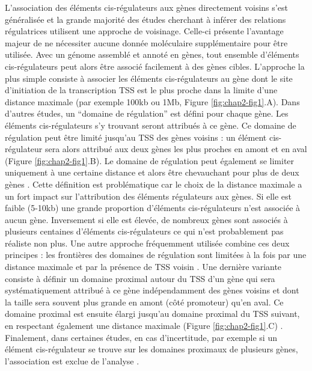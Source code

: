 L’association des éléments \gls{cis}-régulateurs aux gènes directement voisins s’est généralisée et la grande majorité des études cherchant à inférer des relations régulatrices utilisent une approche de voisinage. Celle-ci présente l’avantage majeur de ne nécessiter aucune donnée moléculaire supplémentaire pour être utilisée. Avec un génome assemblé et annoté en gènes, tout ensemble d’éléments \gls{cis}-régulateurs peut alors être associé facilement à des gènes cibles. L’approche la plus simple consiste à associer les éléments \gls{cis}-régulateurs au gène dont le site d’initiation de la transcription \gls{TSS} est le plus proche dans la limite d’une distance maximale (par exemple 100kb ou 1Mb, Figure \ref{fig:chap2-fig1}.A). Dans d’autres études, un “domaine de régulation” est défini pour chaque gène. Les éléments \gls{cis}-régulateurs s’y trouvant seront attribués à ce gène. Ce domaine de régulation peut être limité jusqu’au \acrshort{TSS} des gènes voisins : un élément \gls{cis}-régulateur sera alors attribué aux deux gènes les plus proches en amont et en aval (Figure \ref{fig:chap2-fig1}.B). Le domaine de régulation peut également se limiter uniquement à une certaine distance et alors être chevauchant pour plus de deux gènes \citep{wong_interplay_2017}. Cette définition est problématique car le choix de la distance maximale a un fort impact sur l'attribution des éléments régulateurs aux gènes. Si elle est faible (5-10kb) une grande proportion d’éléments \gls{cis}-régulateurs n’est associée à aucun gène. Inversement si elle est élevée, de nombreux gènes sont associés à plusieurs centaines d’éléments \gls{cis}-régulateurs ce qui n'est probablement pas réaliste non plus. Une autre approche fréquemment utilisée combine ces deux principes : les frontières des domaines de régulation sont limitées à la fois par une distance maximale et par la présence de \acrshort{TSS} voisin \citep{berthelot_complexity_2018, dukler_phylogenetic_2020}. Une dernière variante consiste à définir un domaine proximal autour du \acrshort{TSS} d’un gène qui sera systématiquement attribué à ce gène indépendamment des gènes voisins et dont la taille sera souvent plus grande en amont (côté promoteur) qu’en aval. Ce domaine proximal est ensuite élargi jusqu’au domaine proximal du \acrshort{TSS} suivant, en respectant également une distance maximale (Figure \ref{fig:chap2-fig1}.C) \citep{berthelot_complexity_2018}. Finalement, dans certaines études, en cas d’incertitude, par exemple si un élément \gls{cis}-régulateur se trouve sur les domaines proximaux de plusieurs gènes, l’association est exclue de l’analyse \citep{dukler_phylogenetic_2020}.\\

